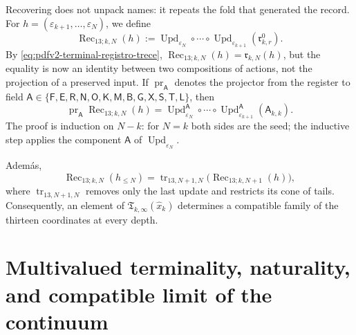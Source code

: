 Recovering does not unpack names: it repeats the fold that generated the
record. For
\(h=(\varepsilon_{k+1},\ldots,\varepsilon_N)\), we define
\begin{equation}
\label{eq:pdfv2-terminal-recuperacion-trece}
 \boxed{
 \operatorname{Rec}_{13;k,N}(h):=
 \operatorname{Upd}_{\varepsilon_N}\circ\cdots\circ
 \operatorname{Upd}_{\varepsilon_{k+1}}
 (\mathfrak r^0_{k,r}).}
\end{equation}
By \eqref{eq:pdfv2-terminal-registro-trece}, \(\operatorname{Rec}_{13;k,N}(h)=\mathfrak r_{k,N}(h)\), but the equality is now an identity between two compositions of actions, not the projection of a preserved input. If \(\operatorname{pr}_{\mathsf A}\) denotes the projector from the register to field \(\mathsf A\in\{\mathsf F,\mathsf E,\mathsf R,\mathsf N,\mathsf O,
\mathsf K,\mathsf M,\mathsf B,\mathsf G,\mathsf X,\mathsf S,\mathsf T,
\mathsf L\}\), then
\begin{equation}
\label{eq:pdfv2-terminal-recuperacion-campo-fold}
 \operatorname{pr}_{\mathsf A}\operatorname{Rec}_{13;k,N}(h)
 =\operatorname{Upd}^{\mathsf A}_{\varepsilon_N}\circ\cdots\circ
  \operatorname{Upd}^{\mathsf A}_{\varepsilon_{k+1}}
  (\mathsf A_{k,k}).
\end{equation}
The proof is induction on \(N-k\): for \(N=k\) both sides are the
seed; the inductive step applies the component \(\mathsf A\) of
\(\operatorname{Upd}_{\varepsilon_N}\).

Adem\'as,
\begin{equation}
\label{eq:pdfv2-terminal-recuperacion-compatible}
 \operatorname{Rec}_{13;k,N}(h_{\leq N})
 =\operatorname{tr}_{13,N+1,N}
   \bigl(\operatorname{Rec}_{13;k,N+1}(h)\bigr),
\end{equation}
where \(\operatorname{tr}_{13,N+1,N}\) removes only the last
update and restricts its cone of tails. Consequently, an element
of \(\mathfrak T_{k,\infty}(\widehat x_k)\) determines a compatible family of the
thirteen coordinates at every depth.

\section{Multivalued terminality, naturality, and compatible limit of the continuum}

